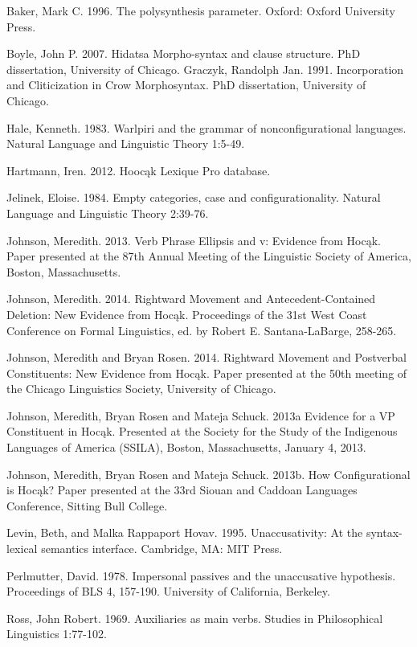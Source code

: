 \documentclass[output=paper]{LSP/langsci}
\begin{document}
\begin{reflist}

Baker, Mark C. 1996. The polysynthesis parameter. Oxford: Oxford University Press.

Boyle, John P. 2007. Hidatsa Morpho-syntax and clause structure. PhD dissertation, University of Chicago.
Graczyk, Randolph Jan. 1991. Incorporation and Cliticization in Crow Morphosyntax. PhD dissertation, University of Chicago.

Hale, Kenneth. 1983. Warlpiri and the grammar of nonconfigurational languages. Natural Language and Linguistic Theory 1:5-49.

Hartmann, Iren. 2012. Hoocąk Lexique Pro database.

Jelinek, Eloise. 1984. Empty categories, case and configurationality. Natural Language and Linguistic Theory 2:39-76.

Johnson, Meredith. 2013. Verb Phrase Ellipsis and v: Evidence from Hocąk. Paper presented at the 87th Annual Meeting of the Linguistic Society of America, Boston, Massachusetts. 

Johnson, Meredith. 2014. Rightward Movement and Antecedent-Contained Deletion: New Evidence from Hocąk. Proceedings of the 31st West Coast Conference on Formal Linguistics, ed. by Robert E. Santana-LaBarge, 258-265.

Johnson, Meredith and Bryan Rosen. 2014. Rightward Movement and Postverbal Constituents: New Evidence from Hocąk. Paper presented at the 50th meeting of the Chicago Linguistics Society, University of Chicago.

Johnson, Meredith, Bryan Rosen and Mateja Schuck. 2013a Evidence for a VP Constituent in Hocąk. Presented at the Society for the Study of the Indigenous Languages of America (SSILA), Boston, Massachusetts, January 4, 2013.

Johnson, Meredith, Bryan Rosen and Mateja Schuck. 2013b. How Configurational is Hocąk? Paper presented at the 33rd Siouan and Caddoan Languages Conference, Sitting Bull College.

Levin, Beth, and Malka Rappaport Hovav. 1995. Unaccusativity: At the syntax-lexical semantics interface. Cambridge, MA: MIT Press.

Perlmutter, David. 1978. Impersonal passives and the unaccusative hypothesis.  Proceedings of BLS 4, 157-190. University of California, Berkeley.

Ross, John Robert. 1969. Auxiliaries as main verbs. Studies in Philosophical Linguistics 1:77-102.


\end{reflist}
\end{document}
